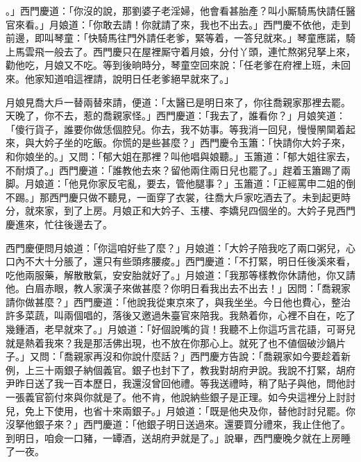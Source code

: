 。」西門慶道：「你沒的說，那劉婆子老淫婦，他會看甚胎產？叫小厮騎馬快請任醫官來看。」月娘道：「你敢去請！你就請了來，我也不出去。」西門慶不依他，走到前邊，即叫琴童：「快騎馬往門外請任老爹，緊等着，一答兒就來。」琴童應諾，騎上馬雲飛一般去了。西門慶只在屋裡厮守着月娘，分付丫頭，連忙熬粥兒拏上來，勸他吃，月娘又不吃。等到後晌時分，琴童空回來說：「任老爹在府裡上班，未回來。他家知道咱這裡請，說明日任老爹絕早就來了。」

月娘見喬大戶一替兩替來請，便道：「太醫已是明日來了，你往喬親家那裡去罷。天晚了，你不去，惹的喬親家怪。」西門慶道：「我去了，誰看你？」月娘笑道：「傻行貨子，誰要你做恁個腔兒。你去，我不妨事。等我消一回兒，慢慢䦛䦟着起來，與大妗子坐的吃飯。你慌的是些甚麼？」西門慶令玉簫：「快請你大妗子來，和你娘坐的。」又問：「郁大姐在那裡？叫他唱與娘聽。」玉簫道：「郁大姐往家去，不耐煩了。」西門慶道：「誰教他去來？留他兩住兩日兒也罷了。」趕着玉簫踢了兩脚。月娘道：「他見你家反宅亂，要去，管他腿事？」玉簫道：「正經罵申二姐的倒不踢。」{}那西門慶只做不聽見，一面穿了衣裳，往喬大戶家吃酒去了。未到起更時分，就來家，到了上房。月娘正和大妗子、玉樓、李嬌兒四個坐的。大妗子見西門慶進來，忙往後邊去了。

西門慶便問月娘道：「你這咱好些了麼？」月娘道：「大妗子陪我吃了兩口粥兒，心口內不大十分脹了，還只有些頭疼腰痠。」西門慶道：「不打緊，明日任後溪來看，吃他兩服藥，解散散氣，安安胎就好了。」月娘道：「我那等樣教你休請他，你又請他。白眉赤眼，教人家漢子來做甚麼？你明日看我出去不出去！」因問：「喬親家請你做甚麼？」西門慶道：「他說我從東京來了，與我坐坐。今日他也費心，整治許多菜蔬，叫兩個唱的，落後又邀過朱臺官來陪我。我熱着你，心裡不自在，吃了幾鍾酒，老早就來了。」月娘道：「好個說嘴的貨！我聽不上你這巧言花語，可哥兒就是熱着我來？我是那活佛出現，也不放在你那心上。就死了也不値個破沙鍋片子。」又問：「喬親家再沒和你說什麼話？」西門慶方告說：「喬親家如今要趁着新例，上三十兩銀子納個義官。銀子也封下了，教我對胡府尹說。我說不打緊，胡府尹昨日送了我一百本歷日，我還沒曾回他禮。等我送禮時，稍了貼子與他，問他討一張義官箚付來與你就是了。他不肯，他說納些銀子是正理。如今央這裡分上討討兒，免上下使用，也省十來兩銀子。」月娘道：「既是他央及你，替他討討兒罷。你沒拏他銀子來？」西門慶道：「他銀子明日送過來。還要買分禮來，我止住他了。到明日，咱僉一口豬，一罈酒，送胡府尹就是了。」說畢，西門慶晚夕就在上房睡了一夜。

